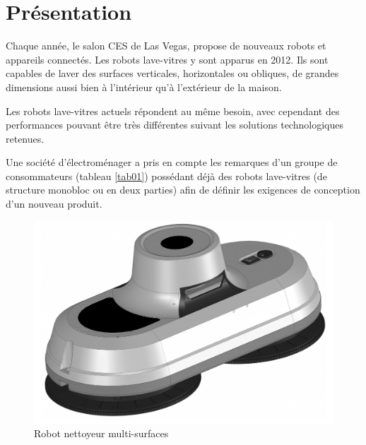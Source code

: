 

\section{Présentation}

Chaque année, le salon CES de Las Vegas, propose de nouveaux robots et appareils
connectés. Les robots lave-vitres y sont apparus en 2012. Ils sont capables de laver des surfaces verticales, horizontales ou obliques, de grandes dimensions aussi bien à l’intérieur qu’à l’extérieur de la maison.

Les robots lave-vitres actuels répondent au même besoin, avec cependant des
performances pouvant être très différentes suivant les solutions technologiques retenues.

Une société d’électroménager a pris en compte les remarques d’un groupe de
consommateurs (tableau \ref{tab01}) possédant déjà des robots lave-vitres (de structure monobloc ou en deux parties) afin de définir les exigences de conception d’un nouveau produit.

\begin{figure}[ht!]
\begin{center}
 \includegraphics[width=0.4\linewidth]{img/fig01}
\end{center}
\caption{\label{fig01} Robot nettoyeur multi-surfaces}
\end{figure}

